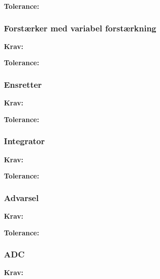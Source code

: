 \textbf{Tolerance:}
\begin{itemize}
\end{itemize}
\subsubsection{Forstærker med variabel forstærkning}
\textbf{Krav:}
\begin{itemize}

\end{itemize}

\textbf{Tolerance:}
\begin{itemize}
\end{itemize}

\subsubsection{Ensretter}
\textbf{Krav:}
\begin{itemize}

\end{itemize}

\textbf{Tolerance:}
\begin{itemize}
\end{itemize}

\subsubsection{Integrator}
\textbf{Krav:}
\begin{itemize}

\end{itemize}

\textbf{Tolerance:}
\begin{itemize}
\end{itemize}

\subsubsection{Advarsel}
\textbf{Krav:}
\begin{itemize}

\end{itemize}

\textbf{Tolerance:}
\begin{itemize}
\end{itemize}

\subsubsection{ADC}
\textbf{Krav:}
\begin{itemize}

\end{itemize}

